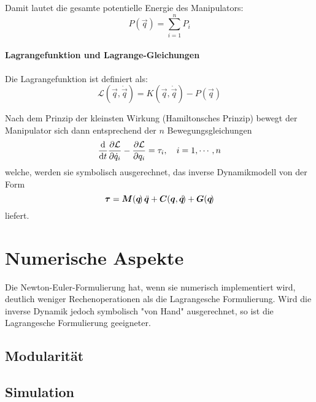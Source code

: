 			Damit lautet die gesamte potentielle Energie des Manipulators:
			\begin{equation*}
				P(\vec{q}\!) = \sum_{i = 1}^{n} P_i
			\end{equation*}

		\paragraph{Lagrangefunktion und Lagrange-Gleichungen}
			Die Lagrangefunktion ist definiert als:
			\begin{equation*}
				\mathcal{L}(\vec{q}, \dot{\vec{q}}\!) = K(\vec{q}, \dot{\vec{q}}\!) - P(\vec{q}\!)
			\end{equation*}

			Nach dem Prinzip der kleinsten Wirkung (Hamiltonsches Prinzip) bewegt der Manipulator sich dann entsprechend der \(n\) Bewegungsgleichungen
			\begin{equation*}
				\dv{t} \frac{\partial \mathcal{L}}{\partial \dot{q}_i} - \frac{\partial \mathcal{L}}{\partial q_i} = \tau_i,\quad i = 1, \cdots, n
			\end{equation*}
			welche, werden sie symbolisch ausgerechnet, das inverse Dynamikmodell von der Form
			\begin{equation*}
				\bm{\tau} = \bm{M}(\bm{q}\!)\, \ddot{\bm{q}} + \bm{C}(\bm{q}, \dot{\bm{q}}\!) + \bm{G}(\bm{q}\!)
			\end{equation*}
			liefert.

	\section{Numerische Aspekte}
		Die Newton-Euler-Formulierung hat, wenn sie numerisch implementiert wird, deutlich weniger Rechenoperationen als die Lagrangesche Formulierung. Wird die inverse Dynamik jedoch symbolisch "von Hand" ausgerechnet, so ist die Lagrangesche Formulierung geeigneter.

		\subsection{Modularität} %

		\subsection{Simulation} %

